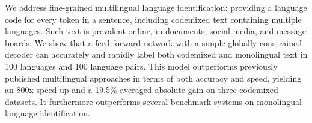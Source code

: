 We address fine-grained multilingual language identification: providing a language code for every token in a sentence, including codemixed text containing multiple languages. Such text is prevalent online, in documents, social media, and message boards. We show that a feed-forward network with a simple globally constrained decoder can accurately and rapidly label both codemixed and monolingual text in 100 languages and 100 language pairs. This model outperforms previously published multilingual approaches in terms of both accuracy and speed, yielding an 800x speed-up and a 19.5\% averaged absolute gain on three codemixed datasets. It furthermore outperforms several benchmark systems on monolingual language identification.
